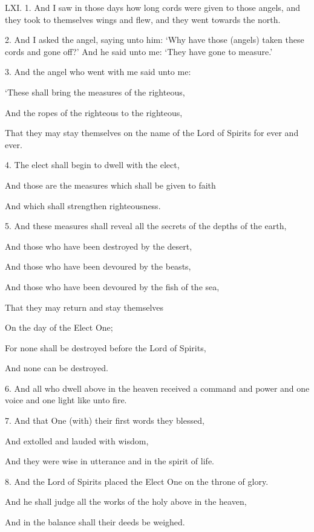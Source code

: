 
LXI. 1. And I saw in those days how long cords
were given to those angels, and they took to themselves
wings and flew, and they went towards the north.

2. And I asked the angel, saying unto him: ‘Why
have those (angels) taken these cords and gone off?’
And he said unto me: ‘They have gone to measure.’

3. And the angel who went with me said unto me:

‘These shall bring the measures of the righteous,

And the ropes of the righteous to the righteous,

That they may stay themselves on the name of the Lord of Spirits for ever and ever.

4. The elect shall begin to dwell with the elect,

And those are the measures which shall be given to faith

And which shall strengthen righteousness.

5. And these measures shall reveal all the secrets of the depths of the earth,

And those who have been destroyed by the desert,

And those who have been devoured by the beasts,

And those who have been devoured by the fish of the sea,

That they may return and stay themselves

On the day of the Elect One;

For none shall be destroyed before the Lord of Spirits,

And none can be destroyed.

6. And all who dwell above in the heaven received
a command and power and one voice and one light
like unto fire.

7. And that One (with) their first words they blessed,

And extolled and lauded with wisdom,

And they were wise in utterance and in the spirit of life.

8. And the Lord of Spirits placed the Elect One on the throne of glory.

And he shall judge all the works of the holy above in the heaven,

And in the balance shall their deeds be weighed.

